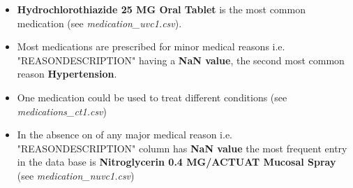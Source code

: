 \documentclass[12pt, twosided]{report}  %
\begin{document}
\begin{itemize}
	\item \textbf{Hydrochlorothiazide 25 MG Oral Tablet} is the most common medication (see \textit{medication\_uvc1.csv}).
	
	\item Most medications are prescribed for minor medical reasons i.e. "REASONDESCRIPTION" having a \textbf{NaN value}, the second most common reason \textbf{Hypertension}.
	
	

	\item One medication could be used to treat different conditions (see \textit{medications\_ct1.csv})
	
	\item In the absence on of any major medical reason i.e. "REASONDESCRIPTION" column has \textbf{NaN value} the most frequent entry in the data base is \textbf{Nitroglycerin 0.4 MG/ACTUAT Mucosal Spray} (see \textit{medication\_nuvc1.csv})
	
\end{itemize} 
\end{document}
